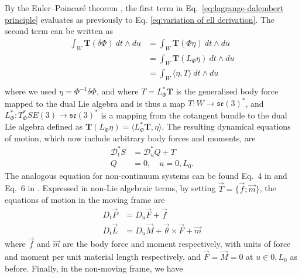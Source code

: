 By the Euler–Poincaré theorem \citep{wisniewskiEulerPoincarReductionExternally}, the first term in Eq.~\ref{eq:lagrange-dalembert principle} evaluates as previously to Eq. \ref{eq:variation of ell derivation}. The second term can be written as
\begin{equation} \label{eq:T derivation}
\begin{aligned}
\int_W \mathbf{T}(\delta \Phi)\ dt \wedge du & = \int_W \mathbf{T}( \Phi \eta )\ dt \wedge du \\
& = \int_W \mathbf{T}( L_\Phi \eta )\ dt \wedge du \\
& = \int_W \langle \eta, T \rangle \ dt \wedge du \\
\end{aligned}
\end{equation}
where we used $\eta = \Phi^{-1} \delta \Phi$, and where $T = L^*_\Phi \mathbf{T}$ is the generalised body force mapped to the dual Lie algebra and is thus a map $T : W \to \mathfrak{se}(3)^*$, and $L^*_\Phi : T^*_\Phi SE(3) \to \mathfrak{se}(3)^*$ is a mapping from the cotangent bundle to the dual Lie algebra defined as $\mathbf{T}( L_\Phi \eta ) = \langle L^*_\Phi \mathbf{T}, \eta \rangle$. The resulting dynamical equations of motion, which now include arbitrary body forces and moments, are
\begin{subequations} \label{eq:dynamics eoms with body forces}
\begin{align}
\mathcal{D}^*_t S & = \mathcal{D}^*_u Q + T \\
Q & = 0, \quad u = 0, L_0. 
\end{align}
\end{subequations}
The analogous equation for non-continuum systems can be found Eq.~4 in \cite{marleHenriPoincareNote2013a} and Eq.~6 in \citep{wisniewskiEulerPoincarReductionExternally}. Expressed in non-Lie algebraic terms, by setting $\vec{T} = \{ \vec{f} ; \vec{m} \}$, the equations of motion in the moving frame are
\begin{subequations} \label{eq:dynamics in terms of V and L with body forces}
\begin{align}
D_t \vec{P} & = D_u \vec{F} + \vec{f} \\
D_t \vec{L} & = D_u \vec{M} + \vec{\theta} \times \vec{F} + \vec{m}
\end{align} \label{eq:dynamics in terms of V and L in moving frame with body forces}
\end{subequations}
where $\vec{f}$ and $\vec{m}$ are the body force and moment respectively, with units of force and moment per unit material length respectively, and $\vec{F} = \vec{M} = 0$ at $u \in 0, L_0$ as before. Finally, in the non-moving frame, we have
